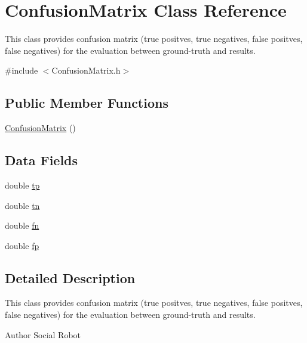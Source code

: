 \hypertarget{classConfusionMatrix}{\section{Confusion\-Matrix Class Reference}
\label{classConfusionMatrix}
}


This class provides confusion matrix (true positves, true negatives, false positves, false negatives) for the evaluation between ground-\/truth and results.  




{\ttfamily \#include $<$Confusion\-Matrix.\-h$>$}

\subsection*{Public Member Functions}
\begin{DoxyCompactItemize}
\item 
\hyperlink{classConfusionMatrix_aecdb5f294e78783699989df1c7affc9a}{Confusion\-Matrix} ()
\end{DoxyCompactItemize}
\subsection*{Data Fields}
\begin{DoxyCompactItemize}
\item 
double \hyperlink{classConfusionMatrix_a0feebe8241b1a2c3c0b2cf59bed4f2c8}{tp}
\item 
double \hyperlink{classConfusionMatrix_af4200b7eccc9cf64e752465141669a3d}{tn}
\item 
double \hyperlink{classConfusionMatrix_a0a9ddddbd9108f0ecb225f82d80eecd6}{fn}
\item 
double \hyperlink{classConfusionMatrix_aa7025b8444745a465c54f3cdcb1eb1d9}{fp}
\end{DoxyCompactItemize}


\subsection{Detailed Description}
This class provides confusion matrix (true positves, true negatives, false positves, false negatives) for the evaluation between ground-\/truth and results. 

\begin{DoxyAuthor}{Author}
Social Robot 
\end{DoxyAuthor}


